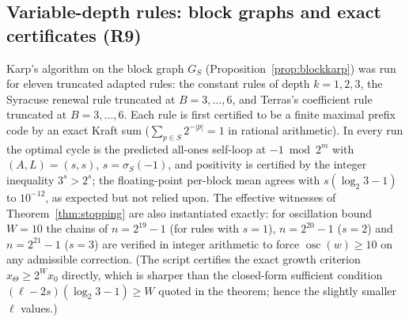 \documentclass[11pt]{amsart}
\theoremstyle{definition}
\theoremstyle{remark}
\begin{document}
\subsection{Variable-depth rules: block graphs and exact certificates (R9)}\label{sec:results-stopping}
Karp's algorithm on the block graph $G_S$ (Proposition~\ref{prop:blockkarp}) was run for eleven truncated adapted rules: the constant rules of depth $k = 1, 2, 3$, the Syracuse renewal rule truncated at $B = 3,\dots,6$, and Terras's coefficient rule truncated at $B = 3,\dots,6$. Each rule is first certified to be a finite maximal prefix code by an exact Kraft sum ($\sum_{p \in S} 2^{-|p|} = 1$ in rational arithmetic). In every run the optimal cycle is the predicted all-ones self-loop at $-1 \bmod 2^m$ with $(A, L) = (s, s)$, $s = \sigma_S(-1)$, and positivity is certified by the integer inequality $3^s > 2^s$; the floating-point per-block mean agrees with $s(\log_2 3 - 1)$ to $10^{-12}$, as expected but not relied upon. The effective witnesses of Theorem~\ref{thm:stopping} are also instantiated exactly: for oscillation bound $W = 10$ the chains of $n = 2^{19} - 1$ (for rules with $s = 1$), $n = 2^{20} - 1$ ($s = 2$) and $n = 2^{21} - 1$ ($s = 3$) are verified in integer arithmetic to force $\operatorname{osc}(w) \ge 10$ on any admissible correction. (The script certifies the exact growth criterion $x_\Theta \ge 2^{W} x_0$ directly, which is sharper than the closed-form sufficient condition $(\ell - 2s)(\log_2 3 - 1) \ge W$ quoted in the theorem; hence the slightly smaller $\ell$ values.)
\end{document}
